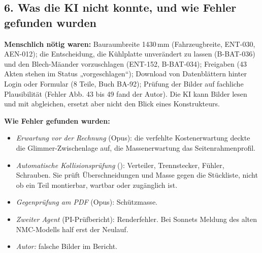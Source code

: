 \documentclass[10pt,a4paper]{article}
\begin{document}
\subsection*{6. Was die KI nicht konnte, und wie Fehler gefunden wurden}
\textbf{Menschlich nötig waren:} Bauraumbreite 1430\,mm (Fahrzeugbreite, ENT-030, AEN-012); die Entscheidung, die Kühlplatte unverändert zu lassen (B-BAT-036) und den Blech-Mäander vorzuschlagen (ENT-152, B-BAT-034); Freigaben (43 Akten stehen im Status „vorgeschlagen“); Download von Datenblättern hinter Login oder Formular (8 Teile, Buch BA-92); Prüfung der Bilder auf fachliche Plausibilität (Fehler Abb. 43 bis 49 fand der Autor). Die KI kann Bilder lesen und mit  abgleichen, ersetzt aber nicht den Blick eines Konstrukteurs.\par
\textbf{Wie Fehler gefunden wurden:}
\begin{itemize}[nosep]
\item \emph{Erwartung vor der Rechnung} (Opus): die verfehlte Kostenerwartung deckte die Glimmer-Zwischenlage auf, die Massenerwartung das Seitenrahmenprofil.
\item \emph{Automatische Kollisionsprüfung} (): Verteiler, Trennstecker, Fühler, Schrauben. Sie prüft Überschneidungen und Masse gegen die Stückliste, nicht ob ein Teil montierbar, wartbar oder zugänglich ist.
\item \emph{Gegenprüfung am PDF} (Opus): Schützmasse.
\item \emph{Zweiter Agent} (PI-Prüfbericht): Renderfehler. Bei Sonnets Meldung des alten NMC-Modells half erst der Neulauf.
\item \emph{Autor:} falsche Bilder im Bericht.
\end{itemize}
\end{document}
